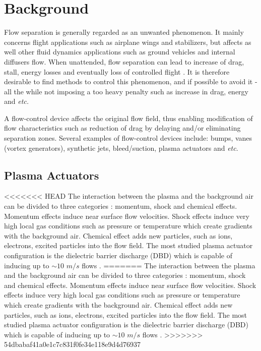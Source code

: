 \documentclass[10pt,a4paper]{article}
\begin{document}


\section{Background}
Flow separation is generally regarded as an unwanted phenomenon. It mainly concerns flight applications such as airplane wings and stabilizers, but affects as well other fluid dynamics applications such as ground vehicles and internal diffusers flow. When unattended, flow separation can lead to increase of drag, stall, energy losses and eventually loss of controlled flight \cite{SIMPSON}. It is therefore desirable to find methods to control this phenomenon, and if possible to avoid it - all the while not imposing a too heavy penalty such as increase in drag, energy and \textit{etc.}  
\par A flow-control device affects the original flow field, thus enabling modification of flow characteristics such as reduction of drag by delaying and/or eliminating separation zones. Several examples of flow-control devices include: bumps, vanes (vortex generators), synthetic jets, bleed/suction, plasma actuators and \textit{etc}.
\subsection{Plasma Actuators}
<<<<<<< HEAD
The interaction between the plasma and the background air can be divided to three categories \cite{FLOWCTRL}: momentum, shock and chemical effects. Momentum effects induce near surface flow velocities. Shock effects induce very high local gas conditions such as pressure or temperature which create gradients with the background air. Chemical effect adds new particles, such as ions, electrons, excited particles into the flow field. The most studied plasma actuator configuration is the dielectric barrier discharge (DBD) which is capable of inducing up to $\sim10$ $m/s$ flows \cite{FLOWCTRL,KOK,WHALLEY,MOREAU}.
=======
The interaction between the plasma and the background air can be divided to three categories \cite{FLOWCTRL}: momentum, shock and chemical effects. Momentum effects induce near surface flow velocities. Shock effects induce very high local gas conditions such as pressure or temperature which create gradients with the background air. Chemical effect adds new particles, such as ions, electrons, excited particles into the flow field. The most studied plasma actuator configuration is the dielectric barrier discharge (DBD) which is capable of inducing up to $\sim10$ $m/s$ flows \cite{MOREAU,FLOWCTRL,KOK,WHALLEY}.
>>>>>>> 54dbabaf41a0e1c7c831f0fe34e118e9d4d76937
\end{document}
